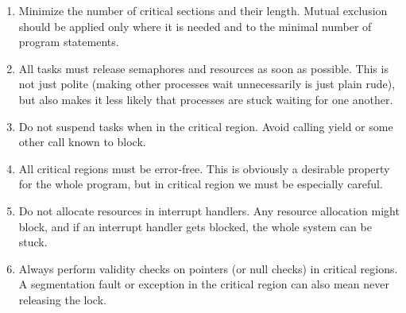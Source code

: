 \begin{enumerate}
\item Minimize the number of critical sections and their length. Mutual exclusion should be applied only where it is needed and to the minimal number of program statements.

\item All tasks must release semaphores and resources as soon as possible. This is not just polite (making other processes wait unnecessarily is just plain rude), but also makes it less likely that processes are stuck waiting for one another.

\item Do not suspend tasks when in the critical region. Avoid calling yield or some other call known to block.

\item All critical regions must be error-free. This is obviously a desirable property for the whole program, but in critical region we must be especially careful.

\item Do not allocate resources in interrupt handlers. Any resource allocation might block, and if an interrupt handler gets blocked, the whole system can be stuck.

\item Always perform validity checks on pointers (or null checks) in critical regions. A segmentation fault or exception in the critical region can also mean never releasing the lock.

\end{enumerate}






